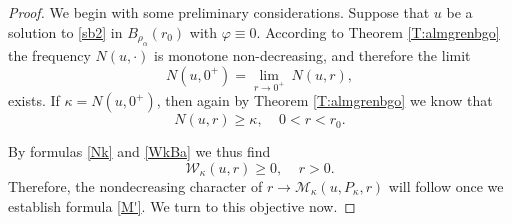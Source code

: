 \documentclass[11pt]{amsart}
\theoremstyle{plain}
\numberwithin{equation}{section}
\begin{document}
\begin{proof}
We begin with some preliminary considerations. Suppose that $u$ be a solution to \eqref{sb2} in $B_{\rho_\alpha}(r_0)$  with ${\varphi} \equiv 0$. According to Theorem \ref{T:almgrenbgo} the frequency $N(u,\cdot)$ is monotone non-decreasing, and therefore the limit
\[
N(u,0^+) = \underset{r\to 0^+}{\lim}\ N(u,r),
\]
exists. If $\kappa = N(u,0^+)$, then again by Theorem \ref{T:almgrenbgo} we know that
\begin{equation}\label{Nk}
N(u,r) \ge \kappa,\ \ \ \ \ 0<r<r_0.
\end{equation}

By formulas \eqref{Nk} and \eqref{WkBa} we thus find
\begin{equation}\label{M2}
\mathcal W_\kappa(u,r) \ge 0,\ \ \ \ \ r>0.
\end{equation}
Therefore, the nondecreasing character of $r\to \mathcal M_\kappa(u,P_\kappa,r)$ will follow once we establish formula \eqref{M'}. We turn to this objective now.


\end{proof}
\end{document}

